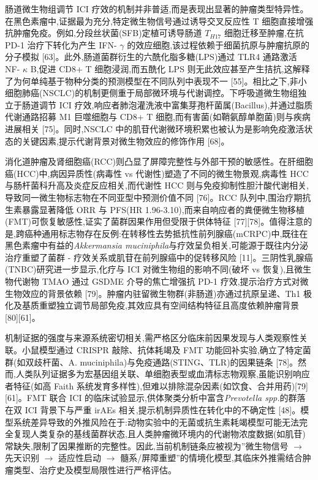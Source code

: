 肠道微生物组调节 ICI 疗效的机制并非普适,而是表现出显著的肿瘤类型特异性。在黑色素瘤中,证据最为充分,特定微生物信号通过诱导交叉反应性 T 细胞直接增强抗肿瘤免疫。例如,分段丝状菌(SFB)定植可诱导肠道 \(T_{H17}\) 细胞迁移至肿瘤,在抗 PD-1 治疗下转化为产生 IFN- \(\gamma\) 的效应细胞,该过程依赖于细菌抗原与肿瘤抗原的分子模拟 {[}63{]}。此外,肠道菌群衍生的六酰化脂多糖(LPS)通过 TLR4 通路激活 NF- \(\kappa\) B,促进 CD8+ T 细胞浸润,而五酰化 LPS 则无此效应甚至产生拮抗,这解释了为何单纯基于物种分类的预测模型在不同队列中表现不一 {[}55{]}。相比之下,非小细胞肺癌(NSCLC)的机制更侧重于局部微环境与代谢调控。下呼吸道微生物组独立于肠道调节 ICI 疗效,响应者肺泡灌洗液中富集芽孢杆菌属(Bacillus),并通过脂质代谢通路招募 M1 巨噬细胞与 CD8+ T 细胞,而有害菌(如鞘氨醇单胞菌)则与疾病进展相关 {[}75{]}。同时,NSCLC 中的肌苷代谢微环境积累也被认为是影响免疫激活状态的关键因素,提示代谢背景对微生物效应的修饰作用 {[}68{]}。

消化道肿瘤及肾细胞癌(RCC)则凸显了屏障完整性与外部干预的敏感性。在肝细胞癌(HCC)中,病因异质性(病毒性 vs 代谢性)塑造了不同的微生物景观,病毒性 HCC 与肠杆菌科升高及炎症反应相关,而代谢性 HCC 则与免疫抑制性胆汁酸代谢相关,导致同一微生物标志物在不同亚型中预测价值不同 {[}76{]}。RCC 队列中,围治疗期抗生素暴露显著降低 ORR 与 PFS(HR 1.96-3.10),而来自响应者的粪便微生物移植(FMT)可恢复敏感性,证实了菌群因果作用但受限于供体特征 {[}77{]}{[}78{]}。值得注意的是,跨癌种通用标志物存在反例:在转移性去势抵抗性前列腺癌(mCRPC)中,既往在黑色素瘤中有益的\emph{Akkermansia muciniphila}与疗效呈负相关,可能源于既往内分泌治疗重塑了菌群 - 疗效关系或肌苷在前列腺癌中的促转移风险 {[}11{]}。三阴性乳腺癌(TNBC)研究进一步显示,化疗与 ICI 对微生物组的影响不同(破坏 vs 恢复),且微生物代谢物 TMAO 通过 GSDME 介导的焦亡增强抗 PD-1 疗效,提示治疗方式对微生物效应的背景依赖 {[}79{]}。肿瘤内驻留微生物群(非肠道)亦通过抗原呈递、Th1 极化及基质重塑独立调节局部免疫,其效应具有空间结构特征且高度依赖肿瘤背景 {[}80{]}{[}61{]}。

机制证据的强度与来源系统密切相关,需严格区分临床前因果发现与人类观察性关联。小鼠模型通过 CRISPR 敲除、抗体耗竭及 FMT 功能回补实验,确立了特定菌群(如双歧杆菌、A. muciniphila)与免疫通路(STING、TLR)的因果链条 {[}78{]}。然而,人类队列证据多为宏基因组关联、单细胞表型或血清标志物观察,虽能识别响应者特征(如高 Faith 系统发育多样性),但难以排除混杂因素(如饮食、合并用药){[}79{]}{[}61{]}。FMT 联合 ICI 的临床试验显示,供体聚类分析中富含\emph{Prevotella spp.}的群落在双 ICI 背景下与严重 irAEs 相关,提示机制异质性在转化中的不确定性 {[}48{]}。模型系统差异导致的外推风险在于:动物实验中的无菌或抗生素耗竭模型可能无法完全复现人类复杂的基线菌群状态,且人类肿瘤微环境内的代谢物浓度数据(如肌苷)常缺失,限制了因果推断的完整性。因此,当前机制链条应被视为''微生物信号 \(\rightarrow\) 先天识别 \(\rightarrow\) 适应性启动 \(\rightarrow\) 髓系/屏障重塑''的情境化模型,其临床外推需结合肿瘤类型、治疗史及模型局限性进行严格评估。

